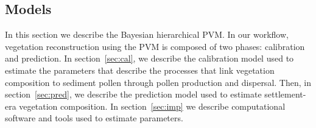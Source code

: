 \documentclass[12pt]{article}
\begin{document}



\subsection{Models}

In this section we describe the Bayesian hierarchical PVM. In our
workflow, vegetation reconstruction using the PVM is composed of two
phases: calibration and prediction. In section~\ref{sec:cal}, we
describe the calibration model used to estimate the parameters that
describe the processes that link vegetation composition to sediment
pollen through pollen production and dispersal. Then, in
section~\ref{sec:pred}, we describe the prediction model used to
estimate settlement-era vegetation composition. In
section~\ref{sec:imp} we describe computational software and tools
used to estimate parameters.
\end{document}
